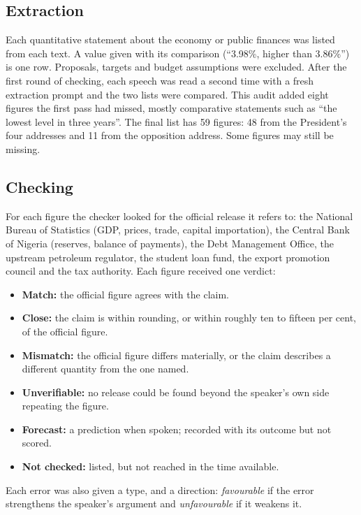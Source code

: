 \documentclass[11pt]{article}
\begin{document}
\subsection{Extraction}

Each quantitative statement about the economy or public finances was listed from each text. A value given with its comparison (``3.98\%, higher than 3.86\%'') is one row. Proposals, targets and budget assumptions were excluded. After the first round of checking, each speech was read a second time with a fresh extraction prompt and the two lists were compared. This audit added eight figures the first pass had missed, mostly comparative statements such as ``the lowest level in three years''. The final list has 59 figures: 48 from the President's four addresses and 11 from the opposition address. Some figures may still be missing.

\subsection{Checking}

For each figure the checker looked for the official release it refers to: the National Bureau of Statistics (GDP, prices, trade, capital importation), the Central Bank of Nigeria (reserves, balance of payments), the Debt Management Office, the upstream petroleum regulator, the student loan fund, the export promotion council and the tax authority. Each figure received one verdict:

\begin{itemize}
\item \textbf{Match:} the official figure agrees with the claim.
\item \textbf{Close:} the claim is within rounding, or within roughly ten to fifteen per cent, of the official figure.
\item \textbf{Mismatch:} the official figure differs materially, or the claim describes a different quantity from the one named.
\item \textbf{Unverifiable:} no release could be found beyond the speaker's own side repeating the figure.
\item \textbf{Forecast:} a prediction when spoken; recorded with its outcome but not scored.
\item \textbf{Not checked:} listed, but not reached in the time available.
\end{itemize}

Each error was also given a type, and a direction: \emph{favourable} if the error strengthens the speaker's argument and \emph{unfavourable} if it weakens it.
\end{document}
